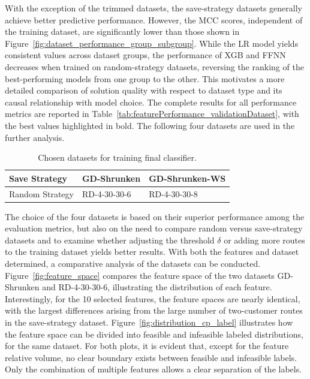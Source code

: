 With the exception of the trimmed datasets, the save-strategy datasets generally achieve better predictive performance.
However, the \gls{MCC} scores, independent of the training dataset, are significantly lower than those shown in
Figure~\ref{fig:dataset_performance_group_subgroup}. While the \gls{LR} model yields consistent values across dataset groups,
the performance of XGB and FFNN decreases when trained on random-strategy datasets, reversing the ranking of the best-performing
models from one group to the other. This motivates a more detailed comparison of solution quality with respect to dataset type and
its causal relationship with model choice. The complete results for all performance metrics are reported in Table~\ref{tab:featurePerformance_validationDataset},
with the best values highlighted in bold. The following four datasets are used in the further analysis.
\begin{table}[ht]
	\centering
	\small
	\setlength{\tabcolsep}{0.75em}
	\def\arraystretch{1.25}
	\begin{tabular}{lll}
		\toprule
		Save Strategy   & GD-Shrunken  & GD-Shrunken-WS \\\midrule
		Random Strategy & RD-4-30-30-6 & RD-4-30-30-8   \\
		\bottomrule
	\end{tabular}
	\caption{Chosen datasets for training final classifier.}
	\label{tab:chosen_datasets}
\end{table}
The choice of the four datasets is based on their superior performance among the evaluation metrics,
but also on the need to compare random versus save-strategy datasets and to examine whether adjusting the threshold $\delta$ or adding
more routes to the training dataset yields better results. With both the features and dataset determined, a comparative analysis of the
datasets can be conducted. Figure~\ref{fig:feature_space} compares the feature space of the two datasets GD-Shrunken and RD-4-30-30-6,
illustrating the distribution of each feature. Interestingly, for the 10 selected features, the feature spaces are nearly identical,
with the largest differences arising from the large number of two-customer routes in the save-strategy dataset.
Figure~\ref{fig:distribution_cp_label} illustrates how the feature space can be divided into
feasible and infeasible labeled distributions, for the same dataset. For both plots, it is evident that, except for the feature relative volume,
no clear boundary exists between feasible and infeasible labels. Only the combination of multiple features allows a clear
separation of the labels.

